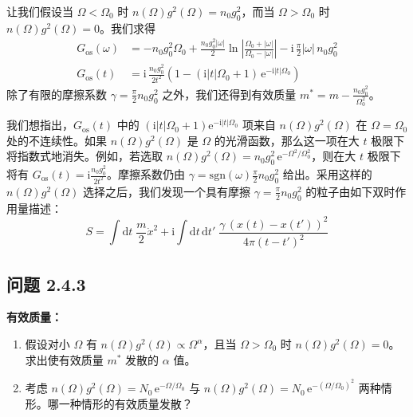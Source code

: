 让我们假设当 $\Omega < \Omega_0$ 时 $n(\Omega)g^2(\Omega) = n_0 g_0^2$，而当 $\Omega > \Omega_0$ 时 $n(\Omega)g^2(\Omega) = 0$。我们求得
\begin{align*}
G_{\mathrm{os}}(\omega) &= -n_0 g_0^2 \Omega_0 + \frac{n_0 g_0^2|\omega|}{2}\ln\left|\frac{\Omega_0 + |\omega|}{\Omega_0 - |\omega|}\right| - \mathrm{i}\,\frac{\pi}{2}|\omega|\, n_0 g_0^2\\
G_{\mathrm{os}}(t) &= \mathrm{i}\,\frac{n_0 g_0^2}{2t^2}\left(1 - (\mathrm{i}|t|\Omega_0 + 1)\,\mathrm{e}^{-\mathrm{i}|t|\Omega_0}\right)
\end{align*}
除了有限的摩擦系数 $\gamma = \frac{\pi}{2}n_0 g_0^2$ 之外，我们还得到有效质量 $m^* = m - \frac{n_0 g_0^2}{\Omega_0^2}$。

我们想指出，$G_{\mathrm{os}}(t)$ 中的 $(\mathrm{i}|t|\Omega_0 + 1)\mathrm{e}^{-\mathrm{i}|t|\Omega_0}$ 项来自 $n(\Omega)g^2(\Omega)$ 在 $\Omega = \Omega_0$ 处的不连续性。如果 $n(\Omega)g^2(\Omega)$ 是 $\Omega$ 的光滑函数，那么这一项在大 $t$ 极限下将指数式地消失。例如，若选取 $n(\Omega)g^2(\Omega) = n_0 g_0^2\,\mathrm{e}^{-\Omega^2/\Omega_0^2}$，则在大 $t$ 极限下将有 $G_{\mathrm{os}}(t) = \mathrm{i}\frac{n_0 g_0^2}{2t^2}$。摩擦系数仍由 $\gamma = \mathrm{sgn}(\omega)\frac{\pi}{2}n_0 g_0^2$ 给出。采用这样的 $n(\Omega)g^2(\Omega)$ 选择之后，我们发现一个具有摩擦 $\gamma = \frac{\pi}{2}n_0 g_0^2$ 的粒子由如下双时作用量描述：
\begin{equation*}
S = \int \mathrm{d}t\;\frac{m}{2}\dot{x}^2 + \mathrm{i}\int \mathrm{d}t\,\mathrm{d}t'\;\frac{\gamma\,(x(t) - x(t'))^2}{4\pi(t - t')^2} \tag{2.4.12}
\end{equation*}


\subsection*{问题 2.4.3}

\textbf{有效质量：}
\begin{enumerate}
\item[1.] 假设对小 $\Omega$ 有 $n(\Omega)g^2(\Omega) \propto \Omega^\alpha$，且当 $\Omega > \Omega_0$ 时 $n(\Omega)g^2(\Omega) = 0$。求出使有效质量 $m^*$ 发散的 $\alpha$ 值。
\item[2.] 考虑 $n(\Omega)g^2(\Omega) = N_0\,\mathrm{e}^{-\Omega/\Omega_0}$ 与 $n(\Omega)g^2(\Omega) = N_0\,\mathrm{e}^{-(\Omega/\Omega_0)^2}$ 两种情形。哪一种情形的有效质量发散？
\end{enumerate}

